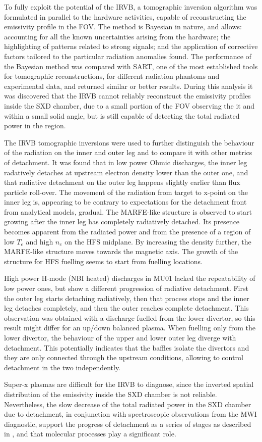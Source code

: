 To fully exploit the potential of the IRVB, a tomographic inversion algorithm was formulated in parallel to the hardware activities, capable of reconstructing the emissivity profile in the FOV. The method is Bayesian in nature, and allows: accounting for all the known uncertainties arising from the hardware; the highlighting of patterns related to strong signals; and the application of corrective factors tailored to the particular radiation anomalies found. The performance of the Bayesian method was compared with SART, one of the most established tools for tomographic reconstructions, for different radiation phantoms and experimental data, and returned similar or better results. During this analysis it was discovered that the IRVB cannot reliably reconstruct the emissivity profiles inside the SXD chamber, due to a small portion of the FOV observing the it and within a small solid angle, but is still capable of detecting the total radiated power in the region.

The IRVB tomographic inversions were used to further distinguish the behaviour of the radiation on the inner and outer leg and to compare it with other metrics of detachment. It was found that in low power Ohmic discharges, the inner leg radatively detaches at upstream electron density lower than the outer one, and that radiative detachment on the outer leg happens slightly earlier than flux particle roll-over. The movement of the radiation from target to x-point on the inner leg is, appearing to be contrary to expectations for the detachment front from analytical models\cite{Lipschultz2016}, gradual. The MARFE-like structure is observed to start growing after the inner leg has completely radiatively detached. Its presence becomes apparent from the radiated power and from the presence of a region of low $T_e$ and high $n_e$ on the HFS midplane. By increasing the density further, the MARFE-like structure moves towards the magnetic axis. The growth of the structure for HFS fuelling seems to start from fuelling locations.

High power H-mode (NBI heated) discharges in MU01 lacked the repeatability of low power ones, but show a different progression of radiative detachment. First the outer leg starts detaching radiatively, then that process stops and the inner leg detaches completely, and then the outer reaches complete detachment. This observation was obtained with a discharge fuelled from the lower divertor, so this result might differ for an up/down balanced plasma. When fuelling only from the lower divertor, the behaviour of the upper and lower outer leg diverge with detachment. This potentially indicates that the baffles isolate the divertors and they are only connected through the upstream conditions, allowing to control detachment in the two independently.

Super-x plasmas are difficult for the IRVB to diagnose, since the inverted spatial distribution of the emissivity inside the SXD chamber is not reliable. Nevertheless, the slow decrease of the total radiated power in the SXD chamber due to detachment, in conjunction with spectroscopic observations from the MWI diagnostic, support the progress of detachment as a series of stages as described in \cite{Verhaegh2022}, and that molecular processes play a significant role.